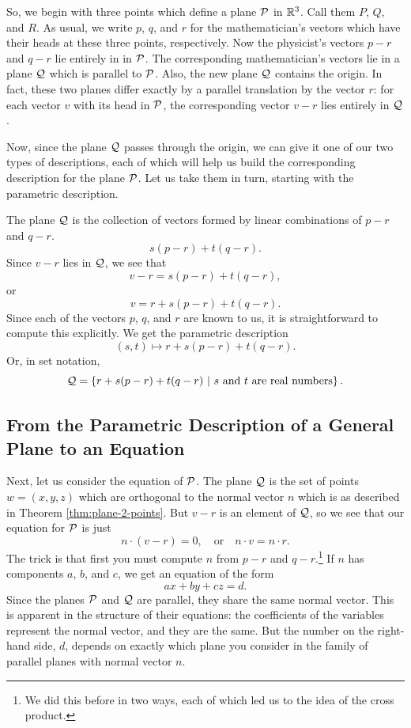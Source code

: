 \documentclass[00-livre-main.tex]{subfiles}
\begin{document}
So, we begin with three points which define a plane $\mathcal{P}$ in $\mathbb{R}^3$. Call them $P$, $Q$, and $R$. As usual, we write $p$, $q$, and $r$ for the mathematician's vectors which have their heads at these three points, respectively. Now the physicist's vectors $p-r$ and $q-r$ lie entirely in in $\mathcal{P}$. The corresponding mathematician's vectors lie in a plane $\mathcal{Q}$ which is parallel to $\mathcal{P}$. Also, the new plane $\mathcal{Q}$ contains the origin. In fact, these two planes differ exactly by a parallel translation by the vector $r$: for each vector $v$ with its head in $\mathcal{P}$, the corresponding vector $v-r$ lies entirely in $\mathcal{Q}$.

Now, since the plane $\mathcal{Q}$ passes through the origin, we can give it one of our two types of descriptions, each of which will help us build the corresponding description for the plane $\mathcal{P}$. Let us take them in turn, starting with the
parametric description. 


The plane $\mathcal{Q}$ is the collection of vectors formed by linear combinations of $p-r$ and $q-r$.
\[
s (p-r) + t (q-r).
\] 
Since $v-r$ lies in $\mathcal{Q}$, we see that
\[
v-r = s(p-r) + t (q-r),
\]
or 
\[
v = r + s(p-r) + t (q-r).
\]
Since each of the vectors $p$, $q$, and $r$ are known to us, it is straightforward to compute this explicitly. We get the parametric description
\[
(s,t) \mapsto r + s(p-r) + t (q-r).
\]
Or, in set notation, 
\[
\mathcal{Q} = \left\{ r + s(p-r) + t (q-r) \ \middle| \ \text{$s$ and $t$ are real numbers} \right\}.
\]

\subsection*{From the Parametric Description of a General Plane to an Equation}

Next, let us consider the equation of $\mathcal{P}$.
The plane $\mathcal{Q}$ is the set of points $w=(x,y,z)$ which are orthogonal to the normal vector $n$ which is as described in Theorem \ref{thm:plane-2-points}.
But $v-r$ is an element of $\mathcal{Q}$, so we see that our equation for $\mathcal{P}$ is just
\[
n \cdot (v-r) = 0, \quad \text{or} \quad n\cdot v = n \cdot r.
\]
The trick is that first you must compute $n$ from $p-r$ and $q-r$.\footnote{We did this before in two ways, each of which led us to the idea of the cross product.} If $n$ has components $a$, $b$, and $c$, we get an equation of the form 
\[
ax+by+cz = d.
\]
Since the planes $\mathcal{P}$ and $\mathcal{Q}$ are parallel, they share the same normal vector. This is apparent in the structure of their equations: the coefficients of the variables represent the normal vector, and they are the same. But the number on the right-hand side, $d$, depends on exactly which plane you consider in the family of parallel planes with normal vector $n$.
\end{document}
